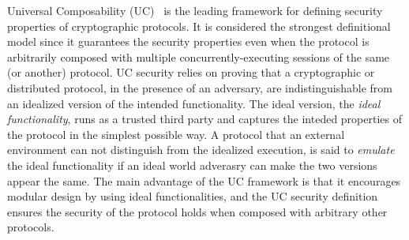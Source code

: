 Universal Composability (UC)~\cite{canettiUC} is the leading framework for defining security properties of cryptographic protocols.
It is considered the strongest definitional model since it guarantees the security properties even when the protocol is arbitrarily composed with
multiple concurrently-executing sessions of the same (or another) protocol.
UC security relies on proving that a cryptographic or distributed protocol, in the presence of an adversary, are indistinguishable from an idealized version of the intended functionality.
The ideal version, the \emph{ideal functionality}, runs as a trusted third party and captures the inteded properties of the protocol in the simplest possible way. 
A protocol that an external environment can not distinguish from the idealized execution, is said to \emph{emulate} the ideal functionality if an ideal world adverasry can make the two versions appear the same.
The main advantage of the UC framework is that it encourages modular design by using ideal functionalities, and the UC security definition ensures the security of the protocol holds when composed with arbitrary other protocols. 


